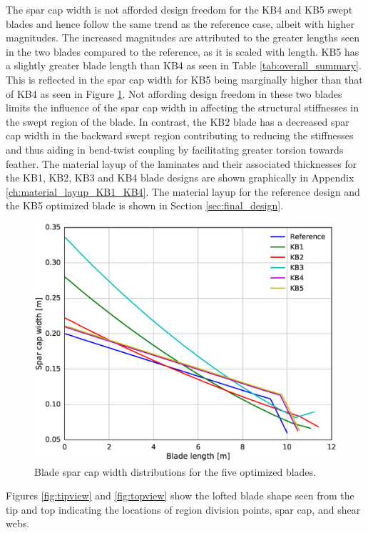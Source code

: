 The spar cap width is not afforded design freedom for the KB4 and KB5 swept blades and hence follow the same trend as the reference case, albeit with higher magnitudes. The increased magnitudes are attributed to the greater lengths seen in the two blades compared to the reference, as it is scaled with length. KB5 has a slightly greater blade length than KB4 as seen in Table \ref{tab:overall_summary}. This is reflected in the spar cap width for KB5 being marginally higher than that of KB4 as seen in Figure \ref{fig:capwidth}. Not affording design freedom in these two blades limits the influence of the spar cap width in affecting the structural stiffnesses in the swept region of the blade. In contrast, the KB2 blade has a decreased spar cap width in the backward swept region contributing to reducing the stiffnesses and thus aiding in bend-twist coupling by facilitating greater torsion towards feather. 
The material layup of the laminates and their associated thicknesses for the KB1, KB2, KB3 and KB4 blade designs are shown graphically in Appendix \ref{ch:material_layup_KB1_KB4}. The material layup for the reference design and the KB5 optimized blade is shown in Section \ref{sec:final_design}.
\begin{figure}[pht]
\begin{center}
	\includegraphics[width=.85\linewidth]{figures/KBcomp_spar_cap_width.eps}
\end{center}
\caption{Blade spar cap width distributions for the five optimized blades.}
\label{fig:capwidth}
\end{figure}

Figures \ref{fig:tipview} and \ref{fig:topview} show the lofted blade shape seen from the tip and top indicating the locations of region division points, spar cap, and shear webs.

